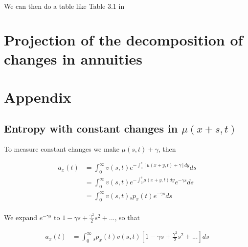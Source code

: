 \documentclass[12pt]{article}
\begin{document}
We can then do a table like Table 3.1 in \citep{Daul2012}


\FloatBarrier
\section{Projection of the decomposition of changes in annuities}









\newpage


%
%



\newpage

\appendix
\section{Appendix}



\subsection{Entropy with constant changes in $\mu(x+s,t)$}\label{sec:EntropyConst}

To measure constant changes we make $\mu(s,t)+\gamma$, then

\begin{equation}\label{eq:EntropyConst1}
\begin{split}
\bar{a}_{x}(t) &= \int_0^\infty{v}(s,t) e^{-\int_{0}^{s} [\mu(x+y,t)+\gamma]dy}ds \\
&= \int_0^\infty {v}(s,t)e^{-\int_{0}^{s} \mu(x+y,t)dy} e^{-\gamma s}ds \\
&= \int_0^\infty {v}(s,t){}_sp_x(t) e^{-\gamma s}ds \\
\end{split}
\end{equation}

We expand $e^{-\gamma s}$ to $1-\gamma s+\frac{\gamma^2}{2} s^{2} +...$, so that


\begin{equation}\label{eq:EntropyConst2}
\begin{split}
\bar{a}_{x}(t) &= \int_0^\infty {}_sp_x(t) {v}(s,t)[1-\gamma s+\frac{\gamma^2}{2} s^{2} +...]ds
\end{split}
\end{equation}
\end{document}
